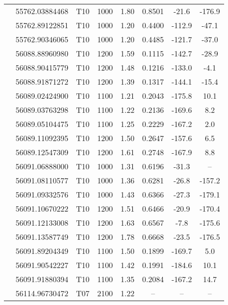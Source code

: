 \documentclass[fleqn,usenatbib]{mnras}
\begin{document}
\begin{center}
\begin{longtable}{lccccccc}
			& 55762.03884468 & T10 & 1000  & 1.80  & 0.8501 & -21.6 & -176.9 \\ %
			& 55762.89122851 & T10 & 1000  & 1.20  & 0.4400 & -112.9 & -47.1 \\ %
			& 55762.90346065 & T10 & 1000  & 1.20  & 0.4485 & -121.7 & -37.0 \\ %
			& 56088.88960980 & T10 & 1200  & 1.59  & 0.1115 & -142.7 & -28.9 \\ %
			& 56088.90415779 & T10 & 1200  & 1.48  & 0.1216 & -133.0 & -4.1 \\ %
			& 56088.91871272 & T10 & 1200  & 1.39  & 0.1317 & -144.1 & -15.4 \\ %
			& 56089.02424900 & T10 & 1100  & 1.21  & 0.2043 & -175.8 & 10.1 \\ %
			& 56089.03763298 & T10 & 1100  & 1.22  & 0.2136 & -169.6 & 8.2 \\ %
			& 56089.05104475 & T10 & 1100  & 1.25  & 0.2229 & -167.2 & 2.0 \\ %
			& 56089.11092395 & T10 & 1200  & 1.50  & 0.2647 & -157.6 & 6.5 \\ %
			& 56089.12547309 & T10 & 1200  & 1.61  & 0.2748 & -167.9 & 8.8 \\ %
			& 56091.06888000 & T10 & 1000  & 1.31  & 0.6196 & -31.3 & -- \\ %
			& 56091.08110577 & T10 & 1000  & 1.36  & 0.6281 & -26.8 & -157.2 \\ %
			& 56091.09332576 & T10 & 1000  & 1.43  & 0.6366 & -27.3 & -179.1 \\ %
			& 56091.10670222 & T10 & 1200  & 1.51  & 0.6466 & -20.9 & -170.4 \\ %
			& 56091.12133008 & T10 & 1200  & 1.63  & 0.6567 & -7.8 & -175.6 \\ %
			& 56091.13587749 & T10 & 1200  & 1.78  & 0.6668 & -23.5 & -176.5 \\ %
			& 56091.89204349 & T10 & 1100  & 1.50  & 0.1899 & -169.7 & 5.0 \\ %
			& 56091.90542227 & T10 & 1100  & 1.42  & 0.1991 & -184.6 & 10.1 \\ %
			& 56091.91880394 & T10 & 1100  & 1.35  & 0.2084 & -167.2 & 14.7 \\ %
			& 56114.96730472 & T07 & 2100  & 1.22  & -- & -- & -- \\ %

\end{longtable}
\end{center}
\end{document}
